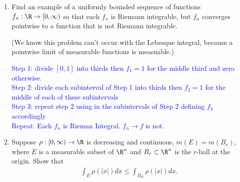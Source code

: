\documentclass[10pt,a4paper]{report}
\newcommand{\BLUE}[1]{\textcolor{blue}{#1}}
\begin{document}
\begin{enumerate}[label=\Roman*.]
\item Find an example of a uniformly bounded sequence of functions $f_n:\R\to[0,\infty)$ so that each $f_n$ is Riemann integrable, but $f_n$ converges pointwise to a function that is not Riemann integrable.
	
	(We know this problem can't occur with the Lebesque integral,  because a pointwise limit of measurable functions is measuable.)
	
	\BLUE{Step 1: divide $[0,1]$ into thirds then $f_1 = 1$ for the middle third and zero otherwise.\\
	Step 2: divide each subinterval of Step 1 into thirds then $f_2 =1$ for the middle of each of these subintervals\\
	Step 3: repeat step 2 using in the subintervals of Step 2 defining $f_3$ accordingly\\
	Repeat:
	Each $f_n$ is Rieman Integral.  $f_n \to f$ is not.
	}
	
\item Suppose $\rho: [0,\infty)\to \R$ is decreasing and continuous, $m(E)=m(B_r)$, where $E$ is a measurable subset of $\R^n$ and $B_r\subset \R^n$ is the $r$-ball at the origin.  Show that 
\begin{align*}
	\int_E \rho(|x|) dx \le \int_{B_R} \rho(|x|)dx.
\end{align*}

\end{enumerate}
\end{document}
